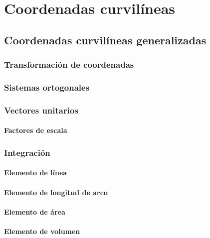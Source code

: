 \documentclass[12pt, fleqn]{report}                             %
\theoremstyle{break}                                            %
\begin{document}
\part{Coordenadas curvilíneas}

    \chapter{Coordenadas curvilíneas generalizadas}
    
        \section{Transformación de coordenadas}
        
        \section{Sistemas ortogonales}
        
        \section{Vectores unitarios}
        
            \subsection{Factores de escala}
        
        \section{Integración}
        
            \subsection{Elemento de línea}
            
            \subsection{Elemento de longitud de arco}
            
            \subsection{Elemento de área}
            
            \subsection{Elemento de volumen}
            
\end{document}
